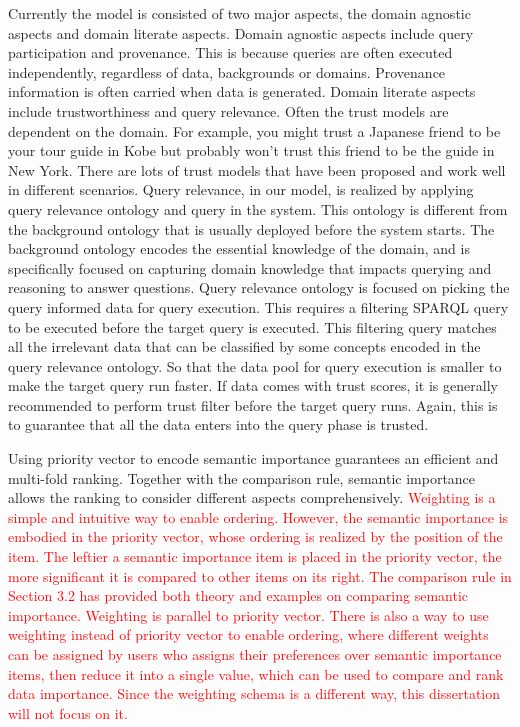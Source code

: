 Currently the model is consisted of two major aspects, the domain agnostic aspects and domain literate aspects. 
Domain agnostic aspects include query participation and provenance.
This is because queries are often executed independently, regardless of data, backgrounds or domains. 
Provenance information is often carried when data is generated. 
Domain literate aspects include trustworthiness and query relevance.
Often the trust models are dependent on the domain. 
For example, you might trust a Japanese friend to be your tour guide in Kobe but probably won't trust this friend to be the guide in New York.
There are lots of trust models that have been proposed and work well in different scenarios. 
Query relevance, in our model, is realized by applying query relevance ontology and query in the system. 
This ontology is different from the background ontology that is usually deployed before the system starts.
The background ontology encodes the essential knowledge of the domain, and is specifically focused on capturing domain knowledge that impacts querying and reasoning to answer questions. 
Query relevance ontology is focused on picking the query informed data for query execution. 
This requires a filtering SPARQL query to be executed before the target query is executed.
This filtering query matches all the irrelevant data that can be classified by some concepts encoded in the query relevance ontology. 
So that the data pool for query execution is smaller to make the target query run faster. 
If data comes with trust scores, it is generally recommended to perform trust filter before the target query runs. 
Again, this is to guarantee that all the data enters into the query phase is trusted.

Using priority vector to encode semantic importance guarantees an efficient and multi-fold ranking.
Together with the comparison rule, semantic importance allows the ranking to consider different aspects comprehensively.
\textcolor{red}{
Weighting is a simple and intuitive way to enable ordering. However, the semantic importance is embodied in the priority vector, whose ordering is realized by the position of the item. The leftier a semantic importance item is placed in the priority vector, the more significant it is compared to other items on its right. The comparison rule in Section 3.2 has provided both theory and examples on comparing semantic importance. Weighting is parallel to priority vector. There is also a way to use weighting instead of priority vector to enable ordering, where different weights can be assigned by users who assigns their preferences over semantic importance items, then reduce it into a single value, which can be used to compare and rank data importance. Since the weighting schema is a different way, this dissertation will not focus on it. }

